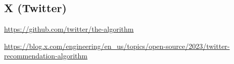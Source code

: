 \subsection{X (Twitter)}\label{cnn/xalgorithm}

\url{https://github.com/twitter/the-algorithm}

\url{https://blog.x.com/engineering/en_us/topics/open-source/2023/twitter-recommendation-algorithm}
